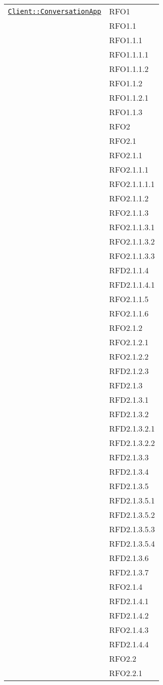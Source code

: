 \begin{longtable}{|>{\centering}m{10cm}|m{3cm}<{\centering}|}
\hyperref[Client::ConversationApp]{\texttt{Client::ConversationApp}} & RFO1\\
& RFO1.1\\
& RFO1.1.1\\
& RFO1.1.1.1\\
& RFO1.1.1.2\\
& RFO1.1.2\\
& RFO1.1.2.1\\
& RFO1.1.3\\
& RFO2\\
& RFO2.1\\
& RFO2.1.1\\
& RFO2.1.1.1\\
& RFO2.1.1.1.1\\
& RFO2.1.1.2\\
& RFO2.1.1.3\\
& RFO2.1.1.3.1\\
& RFO2.1.1.3.2\\
& RFO2.1.1.3.3\\
& RFD2.1.1.4\\
& RFD2.1.1.4.1\\
& RFO2.1.1.5\\
& RFO2.1.1.6\\
& RFO2.1.2\\
& RFO2.1.2.1\\
& RFO2.1.2.2\\
& RFD2.1.2.3\\
& RFD2.1.3\\
& RFD2.1.3.1\\
& RFD2.1.3.2\\
& RFD2.1.3.2.1\\
& RFD2.1.3.2.2\\
& RFD2.1.3.3\\
& RFD2.1.3.4\\
& RFD2.1.3.5\\
& RFD2.1.3.5.1\\
& RFD2.1.3.5.2\\
& RFD2.1.3.5.3\\
& RFD2.1.3.5.4\\
& RFD2.1.3.6\\
& RFD2.1.3.7\\
& RFO2.1.4\\
& RFD2.1.4.1\\
& RFD2.1.4.2\\
& RFO2.1.4.3\\
& RFD2.1.4.4\\
& RFO2.2\\
& RFO2.2.1\\

\end{longtable}
